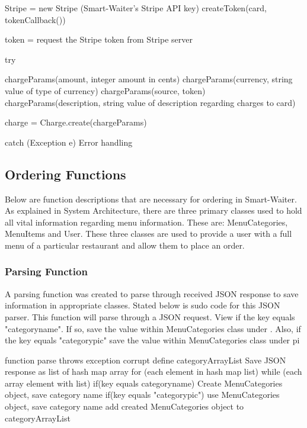 \documentclass[12pt, titlepage]{article}
\begin{document}
Stripe = new Stripe (Smart-Waiter's Stripe API key)
createToken(card, tokenCallback())

token = request the Stripe token from Stripe server

try{
	chargeParams(amount, integer amount in cents)
	chargeParams(currency, string value of type of currency)
	chargeParams(source, token)
	chargeParams(description, string value of description regarding charges to card)

	charge = Charge.create(chargeParams)
}
catch (Exception e){
	Error handling
}
\subsection{Ordering Functions}
Below are function descriptions that are necessary for ordering in Smart-Waiter. As explained in System Architecture, there are three primary classes used to hold all vital information regarding menu information. These are: MenuCategories, MenuItems and User. These three classes are used to provide a user with a full menu of a particular restaurant and allow them to place an order.

\subsubsection{Parsing Function}
A parsing function was created to parse through received JSON response to save information in appropriate classes. Stated below is sudo code for this JSON parser. This function will parse through a JSON request. View if the key equals "categoryname". If so, save the value within MenuCategories class under . Also, if the key equals "categorypic" save the value within MenuCategories  class under pi

	function parse throws exception corrupt		
		define categoryArrayList 
		Save JSON response as list of hash map array
        for (each element in hash map list) {
            while (each  array element with list) {
                if(key equals categoryname){
                    Create MenuCategories object, save category name
                }
                if(key equals "categorypic"){
                    use MenuCategories object, save category name
                }
            }
            add created MenuCategories object to categoryArrayList
        }


\subsubsection{}
\end{document}
